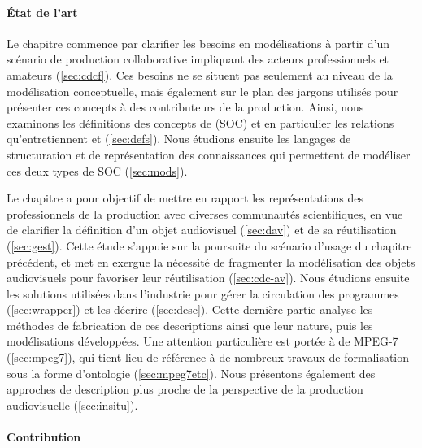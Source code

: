 \paragraph{État de l'art}

Le chapitre  commence par clarifier les besoins en modélisations à partir d'un scénario de production collaborative impliquant des acteurs professionnels et amateurs (\ref{sec:cdcf}).
Ces besoins ne se situent pas seulement au niveau de la modélisation conceptuelle, mais également sur le plan des jargons utilisés pour présenter ces concepts à des contributeurs de la production.
Ainsi, nous examinons les définitions des concepts de  (SOC) et en particulier les relations qu'entretiennent  et  (\ref{sec:defs}).
Nous étudions ensuite les langages de structuration et de représentation des connaissances qui permettent de modéliser ces deux types de SOC (\ref{sec:mods}).

Le chapitre  a pour objectif de mettre en rapport les représentations des professionnels de la production avec diverses communautés scientifiques, en vue de clarifier la définition d'un objet audiovisuel (\ref{sec:dav}) et de sa réutilisation (\ref{sec:gest}).
Cette étude s'appuie sur la poursuite du scénario d'usage du chapitre précédent, et met en exergue la nécessité de fragmenter la modélisation des objets audiovisuels pour favoriser leur réutilisation (\ref{sec:cdc-av}).
Nous étudions ensuite les solutions utilisées dans l'industrie pour gérer la circulation des programmes (\ref{sec:wrapper}) et les décrire (\ref{sec:desc}).
Cette dernière partie analyse les méthodes de fabrication de ces descriptions ainsi que leur nature, puis les modélisations développées.
Une attention particulière est portée à de MPEG-7 (\ref{sec:mpeg7}), qui tient lieu de référence à de nombreux travaux de formalisation sous la forme d'ontologie (\ref{sec:mpeg7etc}).
Nous présentons également des approches de description plus proche de la perspective de la production audiovisuelle (\ref{sec:insitu}).


\paragraph{Contribution}

